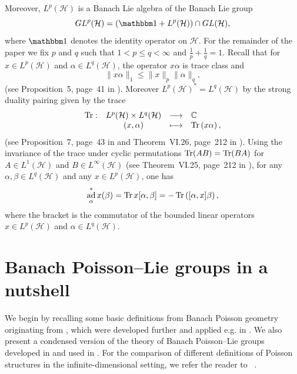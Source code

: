 \documentclass[a4paper,12pt,reqno]{amsart}%
\theoremstyle{definition}
\theoremstyle{remark}
\numberwithin{theorem}{section}
\numberwithin{equation}{section}
\newcommand{\1}{{\bf 1}}
\newcommand{\Id}{\mathbbm 1}
\DeclareMathOperator{\ad}{\textnormal{ad}}
\DeclareMathOperator{\Tr}{\textnormal{Tr}}
\begin{document}
Moreover, $L^p(\mathcal H)$ is a Banach Lie algebra of the Banach Lie group
\[GL^p(\mathcal H) = (\Id + L^p(\mathcal H))\cap GL(\mathcal H),\]
where $\Id$ denotes the identity operator on $\mathcal H$.
For the remainder of the paper we fix $p$ and $q$ such that $1< p\leq q< \infty$ and $\frac{1}{p}+\frac{1}{q} = 1$.
Recall that for $x\in L^p(\mathcal{H})$ and $\alpha\in L^q(\mathcal{H})$, the operator $x\alpha$ is trace class and  
\[
\|x\alpha\|_1\leq \|x\|_p\|\alpha\|_q,
\]
(see Proposition~5, page~41 in \cite{reed2}). 
Moreover  $L^p(\mathcal{H})^* = L^{q}(\mathcal{H})$ 
by the strong duality pairing given by the trace
\[
\begin{array}{lcll}
\Tr: & L^p(\mathcal{H})\times L^{q}(\mathcal{H})& \longrightarrow & \mathbb{C}\\
& (x, \alpha) & \longmapsto & \Tr\left(x\alpha\right),
\end{array}
\]
(see Proposition~7, page~43 in \cite{reed2} and Theorem~VI.26, page~212 in \cite{reed1}). Using the invariance of the trace under cyclic permutations $\Tr(AB) = \Tr(BA)$ for $A\in L^1(\mathcal{H})$ and $B\in L^\infty(\mathcal{H})$ (see Theorem~VI.25, page~212 in \cite{reed1}), for any $\alpha, \beta\in L^{q}(\mathcal{H})$ and any $x\in L^p(\mathcal{H})$, one has
\begin{equation}\label{ad*}
\ad^*_\alpha x(\beta) = \Tr x [\alpha, \beta] = -\Tr\left([\alpha, x]\beta\right),
\end{equation}
where the bracket 
is the commutator of the bounded linear operators $x\in L^{p}(\mathcal{H})$ and $\alpha\in L^{q}(\mathcal{H})$.



\section{Banach Poisson--Lie groups in a nutshell}

We begin by recalling some basic definitions from Banach Poisson geometry originating from \cite{OR}, which were developed further and applied e.g. in \cite{Oext,beltita05,Ratiu-grass,Oind,GO-grass,GT-momentum,pelletier}. We also present a condensed version of the theory of Banach Poisson--Lie groups developed in \cite{tumpach-bruhat} and used in \cite{GT-u-bial}. For the comparison of different definitions of Poisson structures in the infinite-dimensional setting, we refer the reader to ~\cite{GRT-poisson-bial}.
\end{document}
